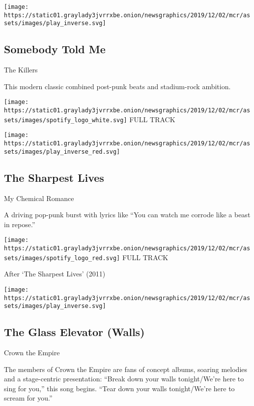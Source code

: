 \texttt{[image: https://static01.graylady3jvrrxbe.onion/newsgraphics/2019/12/02/mcr/assets/images/play\_inverse.svg]}

\hypertarget{somebody-told-me}{%
\subsection{Somebody Told Me}\label{somebody-told-me}}

The Killers

This modern classic combined post-punk beats and stadium-rock ambition.

\href{https://open.spotify.com/track/7HGTkn2aX7MNdKs7nV2xBt?si=Wma9ugf3SjeOIxRkYfuiTw}{}

\texttt{[image: https://static01.graylady3jvrrxbe.onion/newsgraphics/2019/12/02/mcr/assets/images/spotify\_logo\_white.svg]}
FULL TRACK

\texttt{[image: https://static01.graylady3jvrrxbe.onion/newsgraphics/2019/12/02/mcr/assets/images/play\_inverse\_red.svg]}

\hypertarget{the-sharpest-lives-1}{%
\subsection{The Sharpest Lives}\label{the-sharpest-lives-1}}

My Chemical Romance

A driving pop-punk burst with lyrics like ``You can watch me corrode
like a beast in repose.''

\href{https://open.spotify.com/track/2kMjk14RmYyYhhSbipoa9U?si=YRF3dCa9SSyhEHFBkTnD6A}{}

\texttt{[image: https://static01.graylady3jvrrxbe.onion/newsgraphics/2019/12/02/mcr/assets/images/spotify\_logo\_red.svg]}
FULL TRACK

After `The Sharpest Lives' (2011)

\texttt{[image: https://static01.graylady3jvrrxbe.onion/newsgraphics/2019/12/02/mcr/assets/images/play\_inverse.svg]}

\hypertarget{the-glass-elevator-walls}{%
\subsection{The Glass Elevator (Walls)}\label{the-glass-elevator-walls}}

Crown the Empire

The members of Crown the Empire are fans of concept albums, soaring
melodies and a stage-centric presentation: ``Break down your walls
tonight/We're here to sing for you,'' this song begins. ``Tear down your
walls tonight/We're here to scream for you.''

